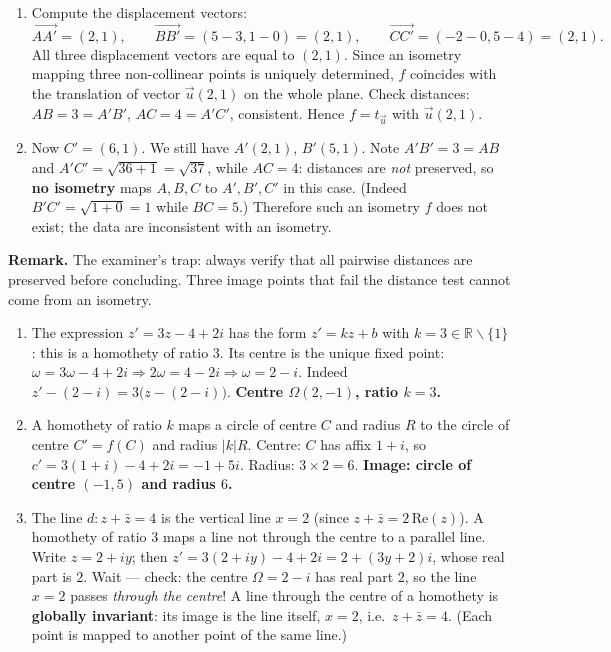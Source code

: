 \documentclass[11pt]{article}
\def\setminus{\mathbin{\backslash}}\let\smallsetminus\setminus
\begin{document}
\begin{corrige}
\begin{enumerate}
\item Compute the displacement vectors:
\[ \overrightarrow{AA'} = (2,1), \qquad \overrightarrow{BB'} = (5-3, 1-0) = (2,1), \qquad \overrightarrow{CC'} = (-2-0, 5-4) = (2,1). \]
All three displacement vectors are equal to $(2,1)$. Since an isometry mapping three non-collinear points is uniquely determined, $f$ coincides with the translation of vector $\vec{u}(2,1)$ on the whole plane. Check distances: $AB = 3 = A'B'$, $AC = 4 = A'C'$, consistent. Hence $f = t_{\vec{u}}$ with $\vec{u}(2,1)$.
\item Now $C' = (6,1)$. We still have $A'(2,1)$, $B'(5,1)$. Note $A'B' = 3 = AB$ and $A'C' = \sqrt{36+1} = \sqrt{37}$, while $AC = 4$: distances are \emph{not} preserved, so \textbf{no isometry} maps $A,B,C$ to $A',B',C'$ in this case. (Indeed $B'C' = \sqrt{1+0} = 1$ while $BC = 5$.) Therefore such an isometry $f$ does not exist; the data are inconsistent with an isometry.
\end{enumerate}
\textbf{Remark.} The examiner's trap: always verify that all pairwise distances are preserved before concluding. Three image points that fail the distance test cannot come from an isometry.
\end{corrige}

\begin{corrige}
\begin{enumerate}
\item The expression $z' = 3z - 4 + 2i$ has the form $z' = kz + b$ with $k = 3 \in \mathbb{R}\setminus\{1\}$: this is a homothety of ratio $3$. Its centre is the unique fixed point: $\omega = 3\omega - 4 + 2i \Rightarrow 2\omega = 4 - 2i \Rightarrow \omega = 2 - i$. Indeed $z' - (2-i) = 3\big(z - (2-i)\big)$. \textbf{Centre $\Omega(2,-1)$, ratio $k = 3$.}
\item A homothety of ratio $k$ maps a circle of centre $C$ and radius $R$ to the circle of centre $C' = f(C)$ and radius $|k|R$. Centre: $C$ has affix $1+i$, so $c' = 3(1+i) - 4 + 2i = -1 + 5i$. Radius: $3 \times 2 = 6$. \textbf{Image: circle of centre $(-1,5)$ and radius $6$.}
\item The line $d: z + \bar{z} = 4$ is the vertical line $x = 2$ (since $z+\bar z = 2\,\mathrm{Re}(z)$). A homothety of ratio $3$ maps a line not through the centre to a parallel line. Write $z = 2 + iy$; then $z' = 3(2+iy) - 4 + 2i = 2 + (3y+2)i$, whose real part is $2$. Wait — check: the centre $\Omega = 2-i$ has real part $2$, so the line $x = 2$ passes \emph{through the centre}! A line through the centre of a homothety is \textbf{globally invariant}: its image is the line itself, $x = 2$, i.e.\ $z + \bar{z} = 4$. (Each point is mapped to another point of the same line.)
\end{enumerate}
\end{corrige}
\end{document}
